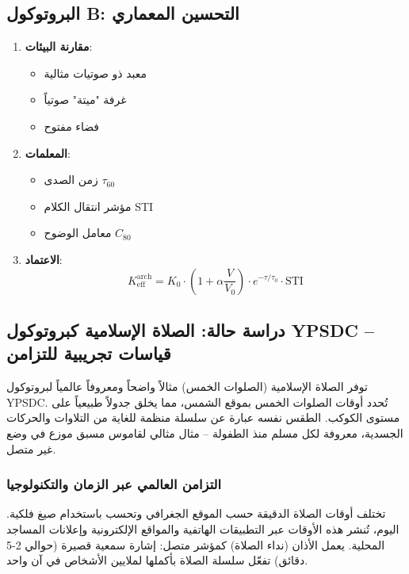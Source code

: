 \documentclass[12pt,a4paper]{article}
\begin{document}
	\subsection{البروتوكول B: التحسين المعماري}
	
	\begin{enumerate}
		\item \textbf{مقارنة البيئات}:
		\begin{itemize}
			\item معبد ذو صوتيات مثالية
			\item غرفة "ميتة" صوتياً
			\item فضاء مفتوح
		\end{itemize}
		\item \textbf{المعلمات}:
		\begin{itemize}
			\item زمن الصدى $\tau_{60}$
			\item مؤشر انتقال الكلام STI
			\item معامل الوضوح $C_{80}$
		\end{itemize}
		\item \textbf{الاعتماد}:
		\[
		K_{\mathrm{eff}}^{\mathrm{arch}} = K_0 \cdot \left(1 + \alpha \frac{V}{V_0}\right) \cdot e^{-\tau/\tau_0} \cdot \mathrm{STI}
		\]
	\end{enumerate}
	
	\subsection{دراسة حالة: الصلاة الإسلامية كبروتوكول YPSDC – قياسات تجريبية للتزامن}
	\label{subsec:islamic_prayer}
	
	توفر الصلاة الإسلامية (الصلوات الخمس) مثالاً واضحاً ومعروفاً عالمياً لبروتوكول YPSDC. تُحدد أوقات الصلوات الخمس بموقع الشمس، مما يخلق جدولاً طبيعياً على مستوى الكوكب. الطقس نفسه عبارة عن سلسلة منظمة للغاية من التلاوات والحركات الجسدية، معروفة لكل مسلم منذ الطفولة – مثال مثالي لقاموس مسبق موزع في وضع غير متصل.
	
	\subsubsection{التزامن العالمي عبر الزمان والتكنولوجيا}
	تختلف أوقات الصلاة الدقيقة حسب الموقع الجغرافي وتحسب باستخدام صيغ فلكية. اليوم، تُنشر هذه الأوقات عبر التطبيقات الهاتفية والمواقع الإلكترونية وإعلانات المساجد المحلية. يعمل الأذان (نداء الصلاة) كمؤشر متصل: إشارة سمعية قصيرة (حوالي 2-5 دقائق) تفعّل سلسلة الصلاة بأكملها لملايين الأشخاص في آن واحد.
	
\end{document}

